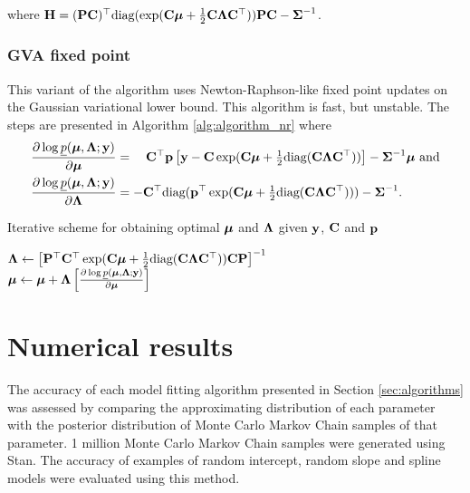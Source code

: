 \documentclass{article}[12pt]
\begin{document}
where ${\bf H} = ({\bf P} {\bf C})^\top \text{diag}(\exp({\bf C} {\boldsymbol \mu} + {\tfrac{1}{2}} {\bf C} {\boldsymbol \Lambda} {\bf C}^\top)) {\bf P} {\bf C} - {\boldsymbol \Sigma}^{-1}$.


\subsubsection{GVA fixed point}


This variant of the algorithm uses Newton-Raphson-like fixed point updates on the Gaussian variational lower
bound. This algorithm is fast, but unstable. The steps are presented in Algorithm \ref{alg:algorithm_nr} where
\begin{align*}
\frac{\partial \log \underline{p}({\boldsymbol \mu}, {\boldsymbol \Lambda}; {\bf y})}{\partial {\boldsymbol\mu}} &= \quad {\bf C}^\top{\bf p} \left [{\bf y} - {\bf C}\exp({\bf C} {\boldsymbol \mu} + {\tfrac{1}{2}} \text{diag}({\bf C} {\boldsymbol \Lambda} {\bf C}^\top)) \right ] - {\boldsymbol \Sigma}^{-1} {\boldsymbol \mu} \text{ and}\\
\frac{\partial \log \underline{p}({\boldsymbol \mu}, {\boldsymbol \Lambda}; {\bf y})}{\partial {\boldsymbol\Lambda}} &= -{\bf C}^\top \text{diag}({\bf p}^\top \exp({\bf C} {\boldsymbol \mu} +{\tfrac{1}{2}} \text{diag}({\bf C} {\boldsymbol \Lambda} {\bf C}^\top))) - {\boldsymbol \Sigma}^{-1}.
\end{align*}

\begin{algorithm}
\caption[Algorithm GVA NR]{Iterative scheme for obtaining optimal ${\boldsymbol \mu}$ and ${\boldsymbol \Lambda}$
given ${\bf y}$, ${\bf C}$ and ${\bf p}$}
\label{alg:algorithm_nr}
\begin{algorithmic}
\STATE ${\boldsymbol \Lambda} \leftarrow \left [ {\bf P}^\top {\bf C}^\top \exp({\bf C} {\boldsymbol \mu} + {\tfrac{1}{2}} \text{diag}({\bf C} {\boldsymbol \Lambda} {\bf C}^\top)) {\bf C} {\bf P} \right ]^{-1}$ \\ [1ex]
\STATE ${\boldsymbol \mu} \leftarrow {\boldsymbol\mu} + {\boldsymbol \Lambda} \left [ \frac{\partial \log \underline{p}({\boldsymbol \mu}, {\boldsymbol \Lambda}; {\bf y})}{\partial {\boldsymbol\mu}} \right ]$
\ENDWHILE
\end{algorithmic}
\end{algorithm}


\section{Numerical results}
\label{sec:results}

The accuracy of each model fitting algorithm presented in Section \ref{sec:algorithms} was assessed by
comparing the approximating distribution of each parameter with the posterior distribution of Monte Carlo
Markov Chain samples of that parameter. 1 million Monte Carlo Markov Chain samples were generated using Stan.
The accuracy of examples of random intercept, random slope and spline models were evaluated using this method.
\end{document}
